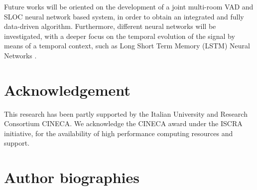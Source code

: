 \documentclass[review]{elsarticle}
\begin{document}
Future works will be oriented on the development of a joint multi-room VAD \cite{ijcnn-vad,ijcnn2016-vad} and SLOC neural network based system, in order to obtain an integrated and fully data-driven algorithm.
Furthermore, different neural networks will be investigated, with a deeper focus on the temporal evolution of the signal by means of a temporal context, such as Long Short Term Memory (LSTM) Neural Networks \cite{hochreiter1997long}. 

\section*{Acknowledgement}
This research has been partly supported by the Italian University and Research Consortium CINECA. We acknowledge the CINECA award under the ISCRA initiative, for the availability of high performance computing resources and support.















\newpage
\section*{Author biographies}
\end{document}
